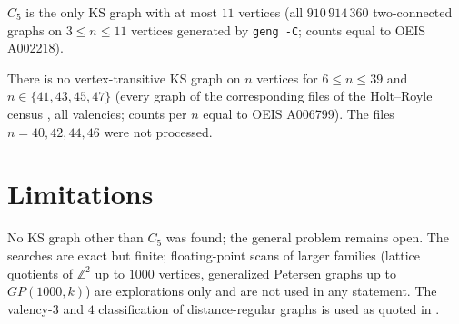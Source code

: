 \documentclass[11pt,a4paper]{report}
\begin{document}
\begin{theorem}\label{thm:small}
$C_5$ is the only KS graph with at most $11$ vertices (all $910\,914\,360$ two-connected graphs on
$3\le n\le11$ vertices generated by \texttt{geng -C}; counts equal to OEIS A002218).
\end{theorem}
\begin{theorem}\label{thm:vt}
There is no vertex-transitive KS graph on $n$ vertices for $6\le n\le39$ and $n\in\{41,43,45,47\}$ (every
graph of the corresponding files of the Holt--Royle census \autocite{HR20,HRdata}, all valencies; counts per
$n$ equal to OEIS A006799). The files $n=40,42,44,46$ were not processed.
\end{theorem}


\section{Limitations}
No KS graph other than $C_5$ was found; the general problem remains open. The searches are exact but finite;
floating-point scans of larger families (lattice quotients of $\mathbb Z^2$ up to $1000$ vertices,
generalized Petersen graphs up to $GP(1000,k)$) are explorations only and are not used in any statement.
The valency-$3$ and $4$ classification of distance-regular graphs is used as quoted in \autocite{MK10}.

\paperreferences
\end{document}
